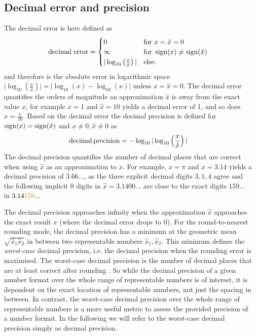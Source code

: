 \subsection{Decimal error and precision}
\label{sec:decimal_precision}

The decimal error is here defined as
\begin{equation}
	\text{decimal error} = \begin{cases}
						0 &\text{for } x = \hat{x} = 0 \\
						\infty &\text{for } \operatorname{sign}(x) \neq \operatorname{sign}(\hat{x}) \\
						\vert \log_{10}\left( \frac{x}{\hat{x}} \right) \vert &\text{else.}
					\end{cases}
	\label{eq:decerror}
\end{equation}
and therefore is the absolute error in logarithmic space
$\vert \log_{10}(\tfrac{x}{\hat{x}}) \vert = \vert \log_{10}(x) - \log_{10}(\hat{x}) \vert$ unless $x = \hat{x} = 0$.
The decimal error quantifies the orders of magnitude an approximation $\hat{x}$ is away from the exact value $x$,
for example $x = 1$ and $\hat{x} = 10$ yields a decimal error of 1, and so does $\hat{x} = \tfrac{1}{10}$. Based on
the decimal error the decimal precision is defined for $\operatorname{sign}(x) = \operatorname{sign}(\hat{x})$ and $x \neq 0, \hat{x} \neq 0$ 
as \citep{Gustafson2017a,Klower2019a}
\begin{equation}
\operatorname{decimal} \operatorname{precision} = -\log_{10} \vert \log_{10} \left( \frac{x}{\hat{x}} \right) \vert
\end{equation}
The decimal precision quantifies the number of decimal places that are correct when using $\hat{x}$ as an approximation
to $x$. For example, $x = \pi$ and $\hat{x} = 3.14$ yields a decimal precision of $3.66...$, as the three explicit decimal
digits $3,1,4$ agree and the following implicit 0 digits in $\hat{x} = 3.1400...$ are close to the exact digits $159...$ in $3.14{\color{pregime}159}...$

The decimal precision approaches infinity when the approximation $\hat{x}$ approaches the exact result $x$ (where the
decimal error drops to 0). For the round-to-nearest rounding mode, the decimal precision has a minimum
at the geometric mean $\sqrt{\hat{x}_1\hat{x}_2}$ in between two representable numbers $\hat{x}_1,\hat{x}_2$. 
This minimum defines the \emph{worst-case} decimal precision, i.e. the decimal precision when the rounding error
is maximised. The worst-case decimal precision is the number of decimal places that are at least correct after rounding
\citep{Gustafson2017a}. So while the decimal precision of a given number format over the whole
range of representable numbers is of interest, it is dependent on the exact location of representable numbers, not just
the spacing in between. In contrast, the worst-case decimal precision over the whole range of representable numbers
is a more useful metric to assess the provided precision of a number format. In the following we will refer to the
worst-case decimal precision simply as decimal precision.

